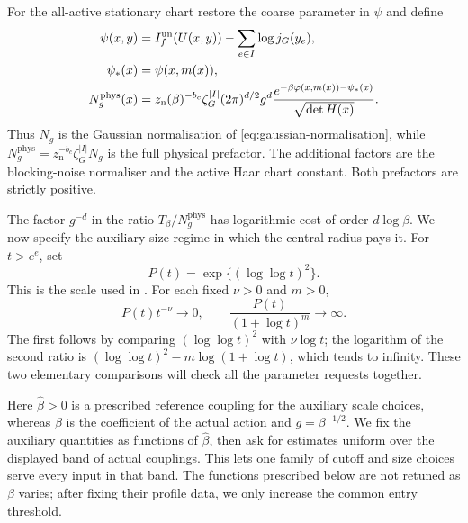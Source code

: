 \documentclass[11pt,reqno]{amsart}
\numberwithin{equation}{section}
\theoremstyle{definition}
\theoremstyle{remark}
\begin{document}
For the all-active stationary chart restore the coarse
parameter in \(\psi\) and define
\begin{align}
       \psi(x,y)&=I_f^{\rm un}(U(x,y))
                            -\sum_{e\in I}\log j_G(y_e),\nonumber\\
       \psi_*(x)&=\psi(x,m(x)),\nonumber\\
       N_g^{\mathrm{phys}}(x)&=z_{\mathrm n}(\beta)^{-b_c}
          \zeta_G^{|I|}(2\pi)^{d/2}g^d
          \frac{e^{-\beta\varphi(x,m(x))-\psi_*(x)}}
               {\sqrt{\det H(x)}}.
 \label{eq:tail-full-prefactor}
\end{align}
Thus \(N_g\) is the Gaussian normalisation of
\eqref{eq:gaussian-normalisation}, while
\(N_g^{\mathrm{phys}}=z_{\mathrm n}^{-b_c}\zeta_G^{|I|}N_g\)
is the full physical prefactor. The additional factors are the
blocking-noise normaliser and the active Haar chart constant.
Both prefactors are strictly positive.

The factor \(g^{-d}\) in the ratio \(T_\beta/N_g^{\mathrm{phys}}\)
has logarithmic cost of order \(d\log\beta\). We now
specify the auxiliary size regime in which the central
radius pays it. For \(t>e^e\), set
\begin{equation}
                         P(t)=\exp\{(\log\log t)^2\}.
 \label{eq:tail-subpower-scale}
\end{equation}
This is the scale used in \cite[Section~15.4, pp.~76--77]{Main}.
For each fixed \(\nu>0\) and \(m>0\),
\begin{equation}
       P(t)t^{-\nu}\longrightarrow0,\qquad
       \frac{P(t)}{(1+\log t)^m}\longrightarrow\infty.
 \label{eq:tail-scale-comparisons}
\end{equation}
The first follows by comparing \((\log\log t)^2\) with
\(\nu\log t\); the logarithm of the second ratio is
\((\log\log t)^2-m\log(1+\log t)\), which tends to
infinity. These two elementary comparisons will check all
the parameter requests together.

Here \(\widehat\beta>0\) is a prescribed reference coupling for the
auxiliary scale choices, whereas \(\beta\) is the coefficient of
the actual action and \(g=\beta^{-1/2}\). We fix the auxiliary
quantities as functions of \(\widehat\beta\), then ask for estimates
uniform over the displayed band of actual couplings. This lets
one family of cutoff and size choices serve every input in that
band. The functions prescribed below are not retuned as \(\beta\)
varies; after fixing their profile data, we only increase the
common entry threshold.
\end{document}
